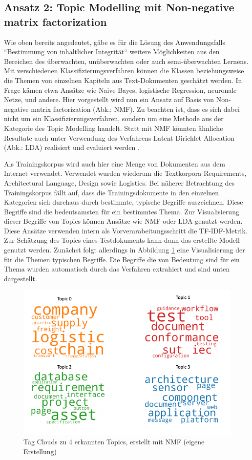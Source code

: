 \subsection{Ansatz 2: Topic Modelling mit Non-negative matrix factorization}

Wie oben bereits angedeutet, gäbe es für die Lösung des Anwendungsfalls ``Bestimmung von inhaltlicher Integrität`` weitere Möglichkeiten aus den Bereichen des überwachten, unüberwachten oder auch semi-überwachten Lernens. Mit verschiedenen Klassifizierungsverfahren können die Klassen beziehungsweise die Themen von einzelnen Kapiteln aus Text-Dokumenten geschätzt werden. In Frage kämen etwa Ansätze wie Naive Bayes, logistische Regression, neuronale Netze, und andere. Hier vorgestellt wird nun ein Ansatz auf Basis von Non-negative matrix factorization (Abk.: NMF). Zu beachten ist, dass es sich dabei nicht um ein Klassifizierungsverfahren, sondern um eine Methode aus der Kategorie des Topic Modelling handelt. Statt mit NMF könnten ähnliche Resultate auch unter Verwendung des Verfahrens Latent Dirichlet Allocation (Abk.: LDA) realisiert und evaluiert werden \cite{scikit1}.

Als Trainingskorpus wird auch hier eine Menge von Dokumenten aus dem Internet verwendet. Verwendet wurden  wiederum die Textkorpora Requirements, Architectural Language, Design sowie Logistics. Bei näherer Betrachtung des Trainingskorpus fällt auf, dass die Trainingsdokumente in den einzelnen Kategorien sich durchaus durch bestimmte, typische Begriffe auszeichnen. Diese Begriffe sind die bedeutsamsten für ein bestimmtes Thema. Zur Visualisierung dieser Begriffe von Topics können Ansätze wie NMF oder LDA genutzt werden. Diese Ansätze verwenden intern als Vorverarabeitungsschritt die TF-IDF-Metrik. Zur Schätzung des Topics eines Testdokuments kann dann das erstellte Modell genutzt werden. Zunächst folgt allerdings in Abbildung \ref{Abbildung:word-clouds} eine Visualisierung der für die Themen typischen Begriffe. Die Begriffe die von Bedeutung sind für ein Thema wurden automatisch durch das Verfahren extrahiert und sind unten dargestellt.
 
\begin{figure}[h]
\centering
\includegraphics[scale=0.95]{content/pics/Picture_18.png}
\caption{Tag Clouds zu 4 erkannten Topics, erstellt mit NMF (eigene Erstellung)}
\label{Abbildung:word-clouds}
\end{figure}

